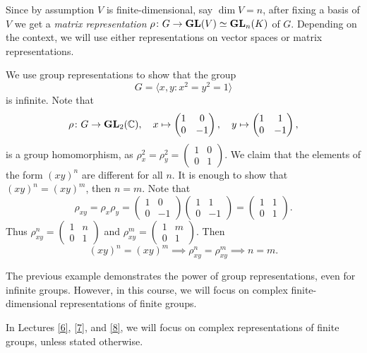 Since by assumption
$V$ is finite-dimensional, say $\dim V=n$, after fixing a basis of $V$ we get a \emph{matrix representation} 
$\rho\colon G\to\mathbf{GL}(V)\simeq\mathbf{GL}_n(K)$ of $G$. Depending on the context, we will use either representations on vector spaces or matrix representations.  

\begin{example}
	We use group representations to show that the group 
	\[
    G=\langle x,y:x^2=y^2=1\rangle
    \]
    is infinite. Note that
	\[
	\rho\colon G\to\mathbf{GL}_2(\mathbb{C}),
	\quad
	x\mapsto\begin{pmatrix}
		1&0\\
		0&-1	
	\end{pmatrix},\quad
 	y\mapsto\begin{pmatrix}
		1&1\\
		0&-1	
	\end{pmatrix},
 	\]
 	is a group homomorphism, as 
 	$\rho_x^2=\rho_y^2=\begin{pmatrix}
		1&0\\
		0&1	
	\end{pmatrix}$. We claim that the elements of the form $(xy)^n$ are
	different for all $n$. It is enough to show that   
	$(xy)^n=(xy)^m$, then $n=m$. Note that
	\[
	\rho_{xy}=\rho_x\rho_y=\begin{pmatrix}
		1&0\\
		0&-1	
	\end{pmatrix}
	\begin{pmatrix}
		1&1\\
		0&-1	
	\end{pmatrix}
	=\begin{pmatrix}
		1&1\\
		0&1	
	\end{pmatrix}.
	\]
	Thus $\rho_{xy}^n=\begin{pmatrix}
		1&n\\
		0&1	
	\end{pmatrix}$ and 
	$\rho_{xy}^m=\begin{pmatrix}
		1&m\\
		0&1	
	\end{pmatrix}$. Then 
	\[
	(xy)^n=(xy)^m\implies\rho_{xy}^n=\rho_{xy}^m\implies n=m.
	\] 
\end{example}

The previous example demonstrates the power of group representations, even for infinite groups. 
However, in this course, we will focus on complex finite-dimensional representations of finite groups.

\begin{convention}
    In Lectures \ref{6}, \ref{7}, and \ref{8}, we will focus on complex representations of finite groups, unless stated otherwise.
\end{convention}

